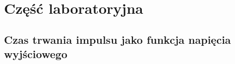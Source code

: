 \documentclass[a4paper,12pt]{article}
\begin{document}
\section{Część laboratoryjna}
\subsection{Czas trwania impulsu jako funkcja napięcia wyjściowego}
\end{document}
